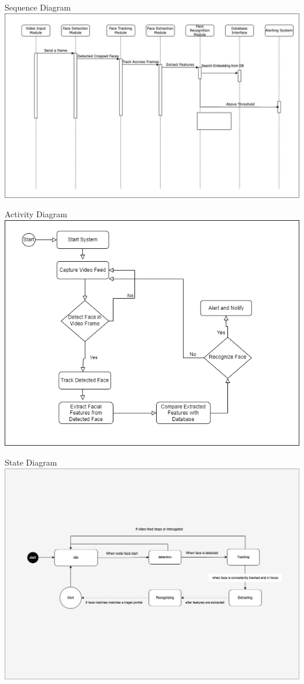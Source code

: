 \begin{frame}{Sequence Diagram}
	\centering
	\includegraphics[height=0.8 \textheight]{components/images/sequence.jpeg}
\end{frame}

\begin{frame}{Activity Diagram}
	\centering
	\includegraphics[height=0.8 \textheight]{components/images/activity.png}
\end{frame}

\begin{frame}{State Diagram}
	\centering
	\includegraphics[height=0.8 \textheight]{components/images/state.jpeg}
\end{frame}

